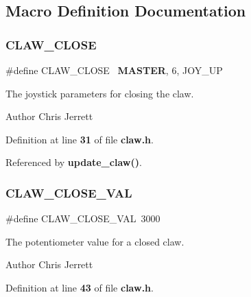 \subsection{Macro Definition Documentation}
\mbox{\label{claw_8h_af2a18397e9efae0be9470a76797b2077}} 
\subsubsection{C\+L\+A\+W\+\_\+\+C\+L\+O\+SE}
{\footnotesize\ttfamily \#define C\+L\+A\+W\+\_\+\+C\+L\+O\+SE~\textbf{ M\+A\+S\+T\+ER}, 6, J\+O\+Y\+\_\+\+UP}



The joystick parameters for closing the claw. 

\begin{DoxyAuthor}{Author}
Chris Jerrett 
\end{DoxyAuthor}


Definition at line \textbf{ 31} of file \textbf{ claw.\+h}.



Referenced by \textbf{ update\+\_\+claw()}.

\mbox{\label{claw_8h_a78d3e6f3d4b60e1be137fdc6dd144224}} 
\subsubsection{C\+L\+A\+W\+\_\+\+C\+L\+O\+S\+E\+\_\+\+V\+AL}
{\footnotesize\ttfamily \#define C\+L\+A\+W\+\_\+\+C\+L\+O\+S\+E\+\_\+\+V\+AL~3000}



The potentiometer value for a closed claw. 

\begin{DoxyAuthor}{Author}
Chris Jerrett 
\end{DoxyAuthor}


Definition at line \textbf{ 43} of file \textbf{ claw.\+h}.

\mbox{\label{claw_8h_ae42993ee3f6f4a0e47f99060fe736ba0}} 
